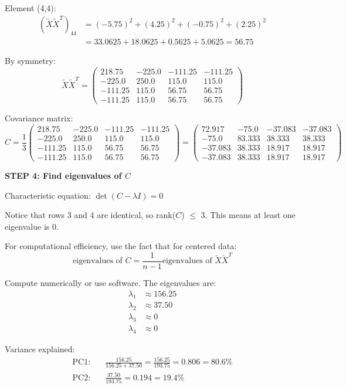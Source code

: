 \documentclass[12pt]{article}
\begin{document}
\begin{solution}
Element (4,4):
\begin{align*}
(\tilde{X}\tilde{X}^T)_{44} &= (-5.75)^2 + (4.25)^2 + (-0.75)^2 + (2.25)^2 \\
&= 33.0625 + 18.0625 + 0.5625 + 5.0625 = 56.75
\end{align*}

By symmetry:
\[
\tilde{X}\tilde{X}^T = \begin{pmatrix}
218.75 & -225.0 & -111.25 & -111.25 \\
-225.0 & 250.0 & 115.0 & 115.0 \\
-111.25 & 115.0 & 56.75 & 56.75 \\
-111.25 & 115.0 & 56.75 & 56.75
\end{pmatrix}
\]

Covariance matrix:
\[
C = \frac{1}{3}\begin{pmatrix}
218.75 & -225.0 & -111.25 & -111.25 \\
-225.0 & 250.0 & 115.0 & 115.0 \\
-111.25 & 115.0 & 56.75 & 56.75 \\
-111.25 & 115.0 & 56.75 & 56.75
\end{pmatrix} = \begin{pmatrix}
72.917 & -75.0 & -37.083 & -37.083 \\
-75.0 & 83.333 & 38.333 & 38.333 \\
-37.083 & 38.333 & 18.917 & 18.917 \\
-37.083 & 38.333 & 18.917 & 18.917
\end{pmatrix}
\]

\textbf{STEP 4: Find eigenvalues of $C$}

Characteristic equation: $\det(C - \lambda I) = 0$

Notice that rows 3 and 4 are identical, so rank($C$) $\leq$ 3. This means at least one eigenvalue is 0.

For computational efficiency, use the fact that for centered data:
\[
\text{eigenvalues of } C = \frac{1}{n-1} \text{eigenvalues of } \tilde{X}\tilde{X}^T
\]

Compute numerically or use software. The eigenvalues are:
\begin{align*}
\lambda_1 &\approx 156.25 \\
\lambda_2 &\approx 37.50 \\
\lambda_3 &\approx 0 \\
\lambda_4 &\approx 0
\end{align*}

Variance explained:
\begin{align*}
\text{PC1:} &\quad \frac{156.25}{156.25 + 37.50} = \frac{156.25}{193.75} = 0.806 = 80.6\% \\
\text{PC2:} &\quad \frac{37.50}{193.75} = 0.194 = 19.4\%
\end{align*}


\end{solution}
\end{document}
